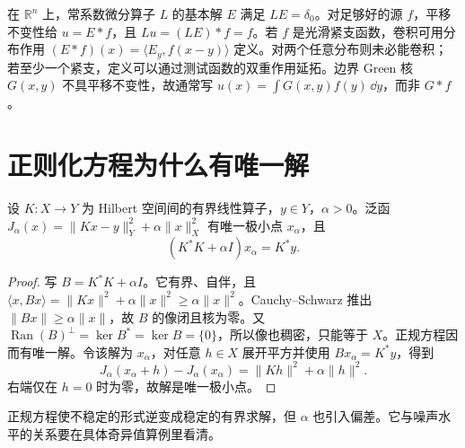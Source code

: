 在 \(\mathbb R^n\) 上，常系数微分算子 \(L\) 的基本解 \(E\) 满足 \(LE=\delta_0\)。对足够好的源 \(f\)，平移不变性给 \(u=E*f\)，且 \(Lu=(LE)*f=f\)。若 \(f\) 是光滑紧支函数，卷积可用分布作用 \((E*f)(x)=\langle E_y,f(x-y)\rangle\) 定义。对两个任意分布则未必能卷积；若至少一个紧支，定义可以通过测试函数的双重作用延拓。边界 Green 核 \(G(x,y)\) 不具平移不变性，故通常写 \(u(x)=\int G(x,y)f(y)\,\dd y\)，而非 \(G*f\)。




\section{正则化方程为什么有唯一解}

\begin{proposition}
设 \(K:X\to Y\) 为 Hilbert 空间间的有界线性算子，\(y\in Y\)，\(\alpha>0\)。泛函 \(J_\alpha(x)=\|Kx-y\|_Y^2+\alpha\|x\|_X^2\) 有唯一极小点 \(x_\alpha\)，且
\[
(K^*K+\alpha I)x_\alpha=K^*y.
\]
\end{proposition}
\begin{proof}
写 \(B=K^*K+\alpha I\)。它有界、自伴，且 \(\langle x,Bx\rangle=\|Kx\|^2+\alpha\|x\|^2\ge\alpha\|x\|^2\)。Cauchy--Schwarz 推出 \(\|Bx\|\ge\alpha\|x\|\)，故 \(B\) 的像闭且核为零。又 \(\operatorname{Ran}(B)^\perp=\ker B^*=\ker B=\{0\}\)，所以像也稠密，只能等于 \(X\)。正规方程因而有唯一解。令该解为 \(x_\alpha\)，对任意 \(h\in X\) 展开平方并使用 \(Bx_\alpha=K^*y\)，得到
\[
J_\alpha(x_\alpha+h)-J_\alpha(x_\alpha)
=\|Kh\|^2+\alpha\|h\|^2.
\]
右端仅在 \(h=0\) 时为零，故解是唯一极小点。
\end{proof}

正规方程使不稳定的形式逆变成稳定的有界求解，但 \(\alpha\) 也引入偏差。它与噪声水平的关系要在具体奇异值算例里看清。

